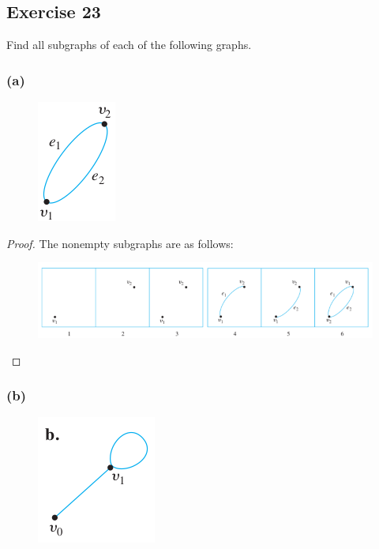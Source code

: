 \documentclass[14pt]{extarticle}
\begin{document}
\subsection{Exercise 23}
Find all subgraphs of each of the following graphs.

\subsubsection{(a)}
\begin{figure}[ht!]
\centering
\includegraphics[scale=0.5]{../images/10.1.23.a.1.png}
\end{figure}

\begin{proof}
The nonempty subgraphs are as follows:

\begin{figure}[ht!]
\centering
\includegraphics[scale=0.6]{../images/10.1.23.a.2.png}
\end{figure}
\end{proof}

\subsubsection{(b)}
\begin{figure}[ht!]
\centering
\includegraphics[scale=0.5]{../images/10.1.23.b.1.png}
\end{figure}
\end{document}
